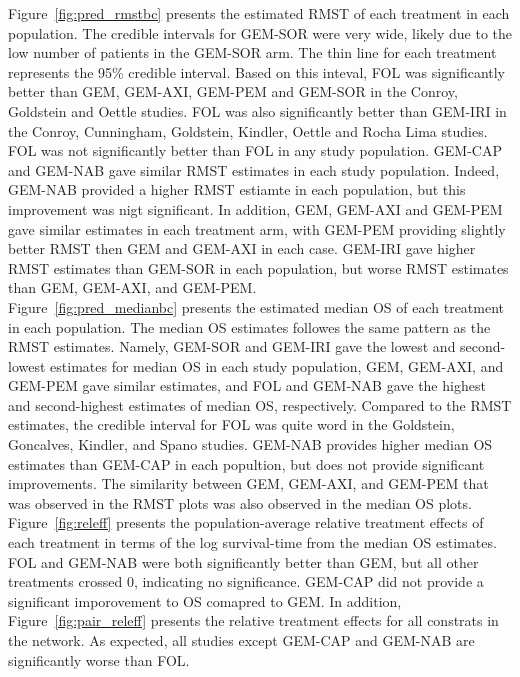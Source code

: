 Figure~\ref{fig:pred_rmstbc} presents the estimated RMST of each treatment in each population. The credible intervals for GEM-SOR were very wide, likely due to the low number of patients in the GEM-SOR arm. The thin line for each treatment represents the 95\% credible interval. Based on this inteval, FOL was significantly better than GEM, GEM-AXI, GEM-PEM and GEM-SOR in the Conroy, Goldstein and Oettle studies. FOL was also significantly better than GEM-IRI in the Conroy, Cunningham, Goldstein, Kindler, Oettle and Rocha Lima studies. FOL was not significantly better than FOL in any study population. GEM-CAP and GEM-NAB gave similar RMST estimates in each study population. Indeed, GEM-NAB provided a higher RMST estiamte in each population, but this improvement was nigt significant. In addition, GEM, GEM-AXI and GEM-PEM gave similar estimates in each treatment arm, with GEM-PEM providing slightly better RMST then GEM and GEM-AXI in each case. GEM-IRI gave higher RMST estimates than GEM-SOR in each population, but worse RMST estimates than GEM, GEM-AXI, and GEM-PEM. \\

Figure~\ref{fig:pred_medianbc} presents the estimated median OS of each treatment in each population. The median OS estimates followes the same pattern as the RMST estimates. Namely, GEM-SOR and GEM-IRI gave the lowest and second-lowest estimates for median OS in each study population, GEM, GEM-AXI, and GEM-PEM gave similar estimates, and FOL and GEM-NAB gave the highest and second-highest estimates of median OS, respectively. Compared to the RMST estimates, the credible interval for FOL was quite word in the Goldstein, Goncalves, Kindler, and Spano studies. GEM-NAB provides higher median OS estimates than GEM-CAP in each popultion, but does not provide significant improvements. The similarity between GEM, GEM-AXI, and GEM-PEM that was observed in the RMST plots was also observed in the median OS plots. \\ 

Figure~\ref{fig:releff} presents the population-average relative treatment effects of each treatment in terms of the log survival-time from the median OS estimates. FOL and GEM-NAB were both significantly better than GEM, but all other treatments crossed 0, indicating no significance. GEM-CAP did not provide a significant imporovement to OS comapred to GEM. In addition, Figure~\ref{fig:pair_releff} presents the relative treatment effects for all constrats in the network. As expected, all studies except GEM-CAP and GEM-NAB are significantly worse than FOL.  \\

